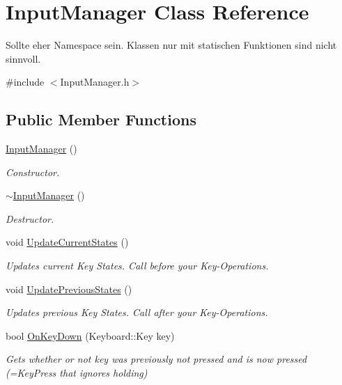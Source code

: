 \hypertarget{class_input_manager}{}\section{Input\+Manager Class Reference}
\label{class_input_manager}


Sollte eher Namespace sein. Klassen nur mit statischen Funktionen sind nicht sinnvoll.  




{\ttfamily \#include $<$Input\+Manager.\+h$>$}

\subsection*{Public Member Functions}
\begin{DoxyCompactItemize}
\item 
\mbox{\hyperlink{class_input_manager_a8be46886da639b26d67181c29dab6d6c}{Input\+Manager}} ()
\begin{DoxyCompactList}\small\item\em Constructor. \end{DoxyCompactList}\item 
\mbox{\hyperlink{class_input_manager_af518290877dd183606709d5852db5491}{$\sim$\+Input\+Manager}} ()
\begin{DoxyCompactList}\small\item\em Destructor. \end{DoxyCompactList}\item 
void \mbox{\hyperlink{class_input_manager_a93883ab3c8f5bee33e66107515acc3e8}{Update\+Current\+States}} ()
\begin{DoxyCompactList}\small\item\em Updates current Key States. Call before you\textquotesingle{}r Key-\/\+Operations. \end{DoxyCompactList}\item 
void \mbox{\hyperlink{class_input_manager_ac965e4ef52a8a7753c106f2bcae64e21}{Update\+Previous\+States}} ()
\begin{DoxyCompactList}\small\item\em Updates previous Key States. Call after you\textquotesingle{}r Key-\/\+Operations. \end{DoxyCompactList}\item 
bool \mbox{\hyperlink{class_input_manager_a426512406d24de8dd5f0fb2241f6ea3c}{On\+Key\+Down}} (Keyboard\+::\+Key key)
\begin{DoxyCompactList}\small\item\em Gets whether or not key was previously not pressed and is now pressed (=Key\+Press that ignores holding) \end{DoxyCompactList}\item 

\end{DoxyCompactItemize}
